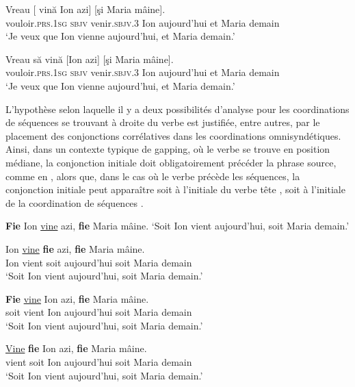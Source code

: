 \ex 
\gll Vreau  [  vină  Ion  azi]  [şi  Maria  mâine]. \label{ch2:ex282b}\\
vouloir.\textsc{prs.1sg}  \textsc{sbjv}  venir.\textsc{sbjv.3}  Ion  aujourd’hui  et  Maria  demain\\
\glt ‘Je veux que Ion vienne aujourd’hui, et Maria demain.’

\ex 
\gll Vreau să vină [Ion azi] [şi Maria mâine]. \label{ch2:ex282c}\\
vouloir.\textsc{prs.1sg}  \textsc{sbjv}  venir.\textsc{sbjv.3}  Ion  aujourd’hui  et  Maria  demain\\
\glt ‘Je veux que Ion vienne aujourd’hui, et Maria demain.’
\z
\z

L’hypothèse selon laquelle il y a deux possibilités d’analyse pour les coordinations de séquences se trouvant à droite du verbe est justifiée, entre autres, par le placement des conjonctions corrélatives dans les coordinations omnisyndétiques. Ainsi, dans un contexte typique de gapping, où le verbe se trouve en position médiane, la conjonction initiale doit obligatoirement précéder la phrase source, comme en , alors que, dans le cas où le verbe précède les séquences, la conjonction initiale peut apparaître soit à l’initiale du verbe tête , soit à l’initiale de la coordination de séquences .

\ea \label{ch2:ex283}
\ea \textbf{Fie} Ion \uline{vine} azi, \textbf{fie} Maria mâine. \label{ch2:ex283a}
\glt  ‘Soit Ion vient aujourd’hui, soit Maria demain.’

\ex
\gll *Ion \uline{vine}  \textbf{fie}  azi,  \textbf{fie}  Maria  mâine. \label{ch2:ex283b}\\
Ion  vient  soit  aujourd’hui  soit  Maria  demain\\
\glt ‘Soit Ion vient aujourd’hui, soit Maria demain.’
\z
\z


\ea \label{ch2:ex284}
\ea 
\gll \textbf{Fie} \uline{vine}  Ion  azi,  \textbf{fie}  Maria  mâine. \label{ch2:ex284a}\\
soit  vient  Ion  aujourd’hui  soit  Maria  demain\\
\glt ‘Soit Ion vient aujourd’hui, soit Maria demain.’

\ex 
\gll \uline{Vine} \textbf{fie} Ion  azi,  \textbf{fie}  Maria  mâine. \label{ch2:ex284b}\\
vient  soit  Ion  aujourd’hui  soit  Maria  demain\\
\glt ‘Soit Ion vient aujourd’hui, soit Maria demain.’
\z
\z

